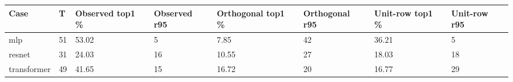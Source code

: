 \begin{tabular}{@{}llllllll@{}}
\toprule
Case & T & Observed top1 \% & Observed r95 & Orthogonal top1 \% & Orthogonal r95 & Unit-row top1 \% & Unit-row r95 \\
\midrule
mlp & 51 & 53.02 & 5 & 7.85 & 42 & 36.21 & 5 \\
resnet & 31 & 24.03 & 16 & 10.55 & 27 & 18.03 & 18 \\
transformer & 49 & 41.65 & 15 & 16.72 & 20 & 16.77 & 29 \\
\bottomrule
\end{tabular}
